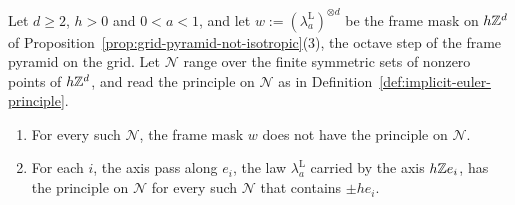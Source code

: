 \begin{proposition}
\label{prop:grid-frame-step-not-selected}
\leanok
Let $d \ge 2$, $h > 0$ and $0 < a < 1$, and let $w := (\lambda^{\mathrm L}_a)^{\otimes d}$ be the
frame mask on $h\mathbb{Z}^d$ of Proposition~\ref{prop:grid-pyramid-not-isotropic}(3), the octave step of
the frame \Matern{} pyramid on the grid. Let $\mathcal{N}$ range over the finite symmetric sets of
nonzero points of $h\mathbb{Z}^d$, and read the principle on $\mathcal{N}$ as in
Definition~\ref{def:implicit-euler-principle}.
\begin{enumerate}
\item For every such $\mathcal{N}$, the frame mask $w$ does not have the principle on $\mathcal{N}$.
\item For each $i$, the axis pass along $e_i$, the law $\lambda^{\mathrm L}_a$ carried by the axis
$h\mathbb{Z} e_i$, has the principle on $\mathcal{N}$ for every such $\mathcal{N}$ that contains $\pm he_i$.
\end{enumerate}

\end{proposition}
